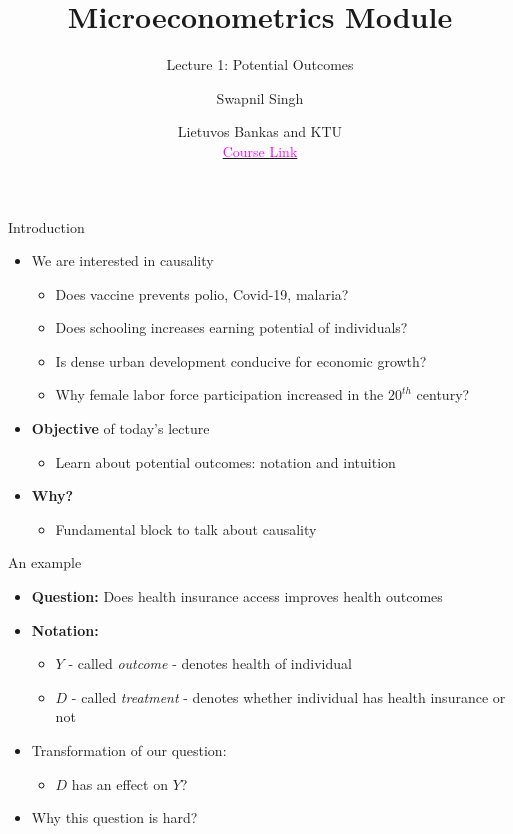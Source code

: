 \documentclass{beamer}
\title{Microeconometrics Module}
\subtitle{Lecture 1: Potential Outcomes}
\author{Swapnil Singh}
\date{Lietuvos Bankas and KTU \\ \href{https://github.com/swapnil1987/econometrics-2024}{\textcolor{magenta}{Course Link}}}
\begin{document}
	
	\maketitle
	
	\begin{frame}{Introduction}
		\begin{itemize}
			\item We are interested in causality
			\begin{itemize}
				\item Does vaccine prevents polio, Covid-19, malaria?
				\item Does schooling increases earning potential of individuals?
				\item Is dense urban development conducive for economic growth?
				\item Why female labor force participation increased in the $20^{th}$ century?
			\end{itemize}
			\item \textbf{Objective} of today's lecture
			\begin{itemize}
				\item Learn about potential outcomes: notation and intuition
			\end{itemize}
			\item \textbf{Why?}
			\begin{itemize}
				\item Fundamental block to talk about causality
			\end{itemize}
		\end{itemize}
	\end{frame}
	
	\begin{frame}{An example}
		\begin{itemize}
			\item \textbf{Question:} Does health insurance access improves health outcomes
			\item \textbf{Notation:}
			\begin{itemize}
				\item $Y$ - called \textit{outcome} - denotes health of individual
				\item $D$ - called \textit{treatment} - denotes whether individual has health insurance or not
			\end{itemize}
			\item Transformation of our question:
			\begin{itemize}
				\item $D$ has an effect on $Y$?
			\end{itemize}
			\item Why this question is hard?
		\end{itemize}
	\end{frame}
	
\end{document}
